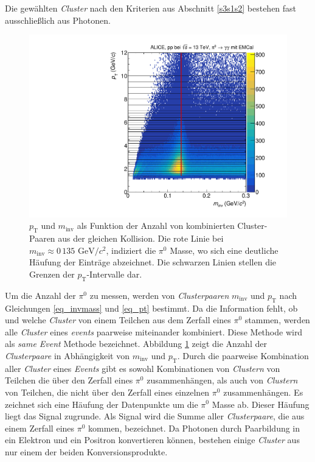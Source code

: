 Die gewählten \textit{Cluster} nach den Kriterien aus Abschnitt \ref{s3s1s2} bestehen fast ausschließlich aus Photonen.
\begin{figure}[t!]
\centering
\includegraphics[width=.7\linewidth]{hInvMass_pT_Signal.pdf}
\caption{$p_\text{T}$ und $m_\text{inv}$ als Funktion der Anzahl von kombinierten  Cluster-Paaren aus der gleichen Kollision.
Die rote Linie bei $m_{\text{inv}}\approx0\,135\text{ GeV/}c^{2}$, indiziert die $\pi^{0}$ Masse, wo sich eine deutliche Häufung der Einträge abzeichnet.
Die schwarzen Linien stellen die Grenzen der $p_{\text{T}}$-Intervalle dar.}
\label{figInvMassPt_a}
\end{figure}
\newline
Um die Anzahl der $\pi^{0}$ zu messen, werden von \textit{Clusterpaaren} $m_\text{inv}$ und $p_\text{T}$ nach Gleichungen \ref{eq_invmass} und \ref{eq_pt} bestimmt.
Da die Information fehlt, ob und welche \textit{Cluster} von einem Teilchen aus dem Zerfall eines $\pi^{0}$ stammen, werden alle \textit{Cluster} eines \textit{events} paarweise miteinander kombiniert.
Diese Methode wird als \textit{same Event} Methode bezeichnet.
Abbildung \ref{figInvMassPt_a} zeigt die Anzahl der \textit{Clusterpaare} in Abhängigkeit von $m_{\text{inv}}$ und $p_{\text{T}}$.
Durch die paarweise Kombination aller \textit{Cluster} eines \textit{Events} gibt es sowohl Kombinationen von \textit{Clustern} von Teilchen die über den Zerfall eines $\pi^{0}$ zusammenhängen, als auch von \textit{Clustern} von Teilchen, die nicht über den Zerfall eines einzelnen $\pi^{0}$ zusammenhängen.
\newline
Es zeichnet sich eine Häufung der Datenpunkte um die $\pi^{0}$ Masse ab.
Dieser Häufung liegt das Signal zugrunde.
Als Signal wird die Summe aller \textit{Clusterpaare}, die aus einem Zerfall eines $\pi^{0}$ kommen, bezeichnet.
Da Photonen durch Paarbildung in ein Elektron und ein Positron konvertieren können, bestehen einige \textit{Cluster} aus nur einem der beiden Konversionsprodukte.
